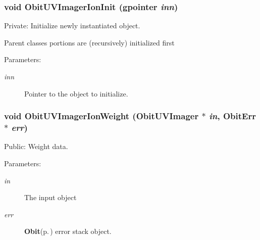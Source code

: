 \subsubsection{\setlength{\rightskip}{0pt plus 5cm}void Obit\-UVImager\-Ion\-Init (gpointer {\em inn})}\label{ObitUVImagerIon_8c_a3}


Private: Initialize newly instantiated object. 

Parent classes portions are (recursively) initialized first \begin{Desc}
\item[Parameters:]
\begin{description}
\item[{\em inn}]Pointer to the object to initialize. \end{description}
\end{Desc}
\subsubsection{\setlength{\rightskip}{0pt plus 5cm}void Obit\-UVImager\-Ion\-Weight ({\bf Obit\-UVImager} $\ast$ {\em in}, {\bf Obit\-Err} $\ast$ {\em err})}\label{ObitUVImagerIon_8c_a13}


Public: Weight data. 

\begin{Desc}
\item[Parameters:]
\begin{description}
\item[{\em in}]The input object \item[{\em err}]{\bf Obit}{\rm (p.\,\pageref{structObit})} error stack object. \end{description}
\end{Desc}
